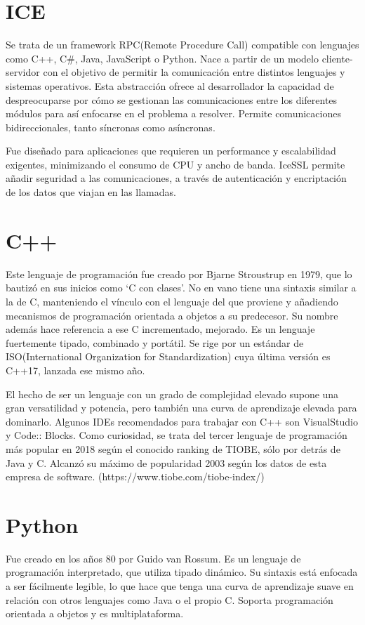 \documentclass[12pt,spanish,chapterprefix, numbers=noenddot]{book}
\numberwithin{equation}{section}
\numberwithin{figure}{section}
\begin{document}
\section{ICE}
Se trata de un framework RPC(Remote Procedure Call) compatible con lenguajes como C++, C#, Java, JavaScript o Python. Nace a partir de un modelo cliente-servidor con el objetivo de permitir la comunicación entre distintos lenguajes y sistemas operativos. Esta abstracción ofrece al desarrollador la capacidad de despreocuparse por cómo se gestionan las comunicaciones entre los diferentes módulos para así enfocarse en el problema a resolver. Permite comunicaciones bidireccionales, tanto síncronas como asíncronas. 

Fue diseñado para aplicaciones que requieren un performance y escalabilidad exigentes, minimizando el consumo de CPU y ancho de banda. IceSSL permite añadir seguridad a las comunicaciones, a través de autenticación y encriptación de los datos que viajan en las llamadas. 

\section{C++}
Este lenguaje de programación fue creado por Bjarne Stroustrup en 1979, que lo bautizó en sus inicios como ‘C con clases’. No en vano tiene una sintaxis similar a la de C, manteniendo el vínculo con el lenguaje del que proviene y añadiendo mecanismos de programación orientada a objetos a su predecesor. Su nombre además hace referencia a ese C incrementado, mejorado. 
Es un lenguaje fuertemente tipado, combinado y portátil. Se rige por un estándar de ISO(International Organization for Standardization) cuya última versión es C++17, lanzada ese mismo año. 

El hecho de ser un lenguaje con un grado de complejidad elevado supone una gran versatilidad y potencia, pero también una curva de aprendizaje elevada para dominarlo.
Algunos IDEs recomendados para trabajar con C++ son VisualStudio y Code:: Blocks. 
Como curiosidad, se trata del tercer lenguaje de programación más popular en 2018 según el conocido ranking de TIOBE, sólo por detrás de Java y C. Alcanzó su máximo de popularidad 2003 según los datos de esta empresa de software. (https://www.tiobe.com/tiobe-index/)

\section{Python}
Fue creado en los años 80 por Guido van Rossum. Es un lenguaje de programación interpretado, que utiliza tipado dinámico. Su sintaxis está enfocada a ser fácilmente legible, lo que hace que tenga una curva de aprendizaje suave en relación con otros lenguajes como Java o el propio C. Soporta programación orientada a objetos y es multiplataforma.
\end{document}
